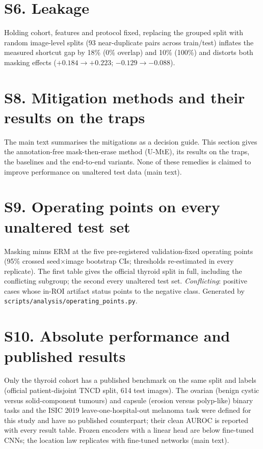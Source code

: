 \documentclass[review,3p]{elsarticle}
\begin{document}
\section*{S6. Leakage}\label{supp:S6}
Holding cohort, features and protocol fixed, replacing the grouped split with random image-level splits (93
near-duplicate pairs across train/test) inflates the measured shortcut gap by 18\% (0\% overlap) and 10\% (100\%)
and distorts both masking effects ($+0.184\rightarrow+0.223$; $-0.129\rightarrow-0.088$).



\section*{S8. Mitigation methods and their results on the traps}\label{supp:S8}
The main text summarises the mitigations as a decision guide. This section gives the annotation-free mask-then-erase
method (U-MtE), its results on the traps, the baselines and the end-to-end variants. None of these remedies is claimed
to improve performance on unaltered test data (main text).


\section*{S9. Operating points on every unaltered test set}\label{supp:S9}
Masking minus ERM at the five pre-registered validation-fixed operating points (95\% crossed seed$\times$image
bootstrap CIs; thresholds re-estimated in every replicate). The first table gives the official thyroid split in full,
including the conflicting subgroup; the second every unaltered test set. \emph{Conflicting}: positive cases whose in-ROI artifact status points to
the negative class. Generated by \texttt{scripts/analysis/operating\_points.py}.



\section*{S10. Absolute performance and published results}\label{supp:S10}
Only the thyroid cohort has a published benchmark on the same split and labels (official patient-disjoint TNCD split,
614 test images). The ovarian (benign cystic versus solid-component tumours) and capsule (erosion versus polyp-like)
binary tasks and the ISIC 2019 leave-one-hospital-out melanoma task were defined for this study and have no published
counterpart; their clean AUROC is reported with every result table. Frozen encoders with a linear head are below
fine-tuned CNNs; the location law replicates with fine-tuned networks (main text).

\end{document}
